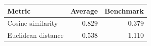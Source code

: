 
\begin{tabular}{lrr}
\toprule
Metric & Average & Benchmark\\
\midrule
Cosine similarity & 0.829 & 0.379\\
Euclidean distance & 0.538 & 1.110\\
\bottomrule
\end{tabular}
